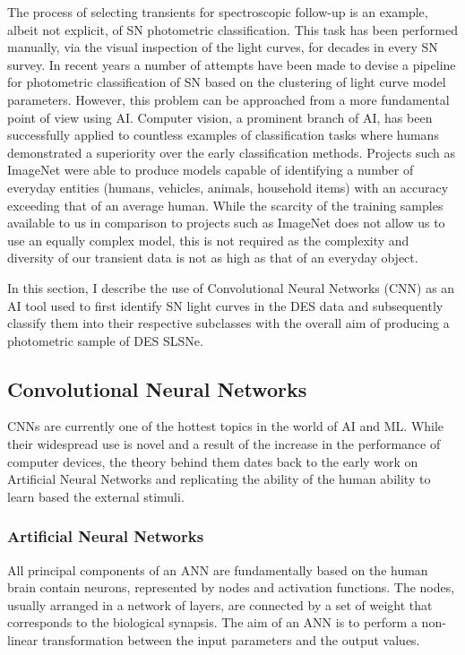The process of selecting transients for spectroscopic follow-up is an example, albeit not explicit, of SN photometric classification. This task has been performed manually, via the visual inspection of the light curves, for decades in every SN survey. In recent years a number of attempts have been made to devise a pipeline for photometric classification of SN based on the clustering of light curve model parameters. However, this problem can be approached from a more fundamental point of view using AI. Computer vision, a prominent branch of AI, has been successfully applied to countless examples of classification tasks where humans demonstrated a superiority over the early classification methods. Projects such as ImageNet \citep{Russakovsky2014} were able to produce models capable of identifying a number of everyday entities (humans, vehicles, animals, household items) with an accuracy exceeding that of an average human. While the scarcity of the training samples available to us in comparison to projects such as ImageNet does not allow us to use an equally complex model, this is not required as the complexity and diversity of our transient data is not as high as that of an everyday object.

In this section, I describe the use of Convolutional Neural Networks (CNN) as an AI tool used to first identify SN light curves in the DES data and subsequently classify them into their respective subclasses with the overall aim of producing a photometric sample of DES SLSNe.

\subsection{Convolutional Neural Networks} \label{sec:CNN}
CNNs are currently one of the hottest topics in the world of AI and ML. While their widespread use is novel and a result of the increase in the performance of computer devices, the theory behind them dates back to the early work on Artificial Neural Networks \citep[ANN;][]{Mcculloch1943} and replicating the ability of the human ability to learn based the external stimuli.

\subsubsection{Artificial Neural Networks}
All principal components of an ANN are fundamentally based on the human brain contain neurons, represented by nodes and activation functions. The nodes, usually arranged in a network of layers, are connected by a set of weight that corresponds to the biological synapsis. The aim of an ANN is to perform a non-linear transformation between the input parameters and the output values.

